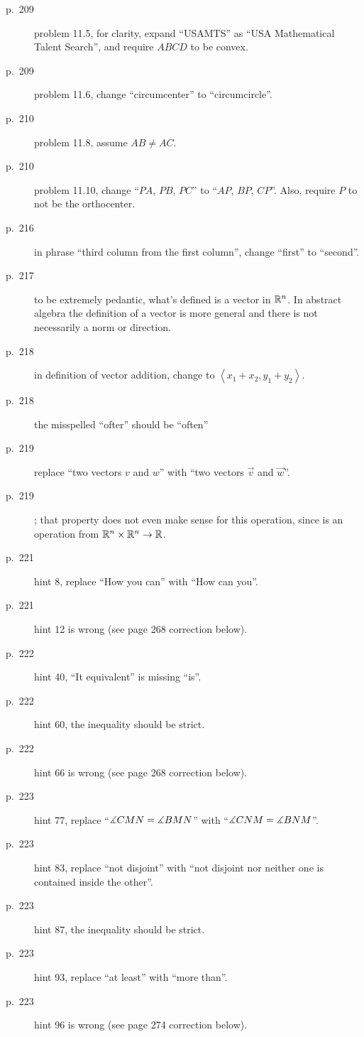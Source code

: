 \documentclass[11pt]{scrartcl}
\begin{document}
\begin{description}
\item[p.\  209] problem 11.5, for clarity,
  expand ``USAMTS'' as ``USA Mathematical Talent Search'',
  and require $ABCD$ to be convex.
\item[p.\  209] problem 11.6, change ``circumcenter'' to ``circumcircle''.
\item[p.\  210] problem 11.8, assume $AB \neq AC$.
\item[p.\  210] problem 11.10, change ``$PA$, $PB$, $PC$'' to ``$AP$, $BP$, $CP$''.
  Also, require $P$ to not be the orthocenter.
\item[p.\  216] in phrase ``third column from the first column'',
  change ``first'' to ``second''.
\item[p.\  217] to be extremely pedantic, what's defined is a vector in $\mathbb R^n$.
  In abstract algebra the definition of a vector is more general
  and there is not necessarily a norm or direction.
\item[p.\  218] in definition of vector addition,
  change to $\left\langle x_1+x_2, y_1+y_2 \right\rangle$.
\item[p.\  218] the misspelled ``ofter'' should be ``often''
\item[p.\  219] replace ``two vectors $v$ and $w$'' with ``two vectors $\vec v$ and $\vec w$''.
\item[p.\  219] ;
  that property does not even make sense for this operation,
  since is an operation from $\mathbb R^n \times \mathbb R^n \to \mathbb R$.
\item[p.\  221] hint 8, replace ``How you can'' with ``How can you''.
\item[p.\  221] hint 12 is wrong (see page 268 correction below).
\item[p.\  222] hint 40, ``It equivalent'' is missing ``is''.
\item[p.\  222] hint 60, the inequality should be strict.
\item[p.\  222] hint 66 is wrong (see page 268 correction below).
\item[p.\  223] hint 77, replace ``$\measuredangle CMN = \measuredangle BMN$''
  with ``$\measuredangle CNM = \measuredangle BNM$''.
\item[p.\  223] hint 83, replace ``not disjoint'' with
  ``not disjoint nor neither one is contained inside the other''.
\item[p.\  223] hint 87, the inequality should be strict.
\item[p.\  223] hint 93, replace ``at least'' with ``more than''.
\item[p.\  223] hint 96 is wrong (see page 274 correction below).

\end{description}
\end{document}
